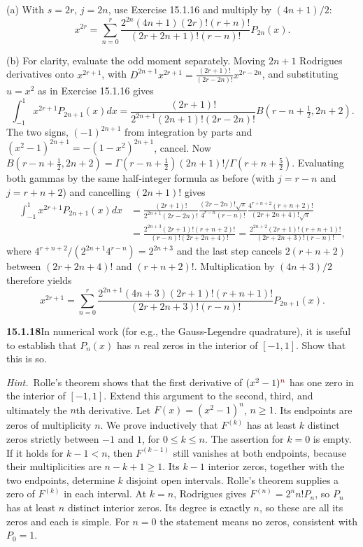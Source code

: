 (a) With $s=2r$, $j=2n$, use Exercise 15.1.16 and multiply by
$(4n+1)/2$:
\[
\boxed{x^{2r}=\sum_{n=0}^r
\frac{2^{2n}(4n+1)(2r)!(r+n)!}
{(2r+2n+1)!(r-n)!}P_{2n}(x)}.
\]

(b) For clarity, evaluate the odd moment separately. Moving $2n+1$
Rodrigues derivatives onto $x^{2r+1}$, with
$D^{2n+1}x^{2r+1}=\frac{(2r+1)!}{(2r-2n)!}x^{2r-2n}$, and substituting
$u=x^2$ as in Exercise 15.1.16 gives
\[
\int_{-1}^1x^{2r+1}P_{2n+1}(x)dx
=\frac{(2r+1)!}{2^{2n+1}(2n+1)!(2r-2n)!}
 B(r-n+\tfrac12,2n+2).
\]
The two signs, $(-1)^{2n+1}$ from integration by parts and
$(x^2-1)^{2n+1}=-(1-x^2)^{2n+1}$, cancel. Now
$B(r-n+\frac12,2n+2)=\Gamma(r-n+\frac12)(2n+1)!/\Gamma(r+n+\frac52)$.
Evaluating both gammas by the same half-integer formula as before
(with $j=r-n$ and $j=r+n+2$) and cancelling $(2n+1)!$ gives
\begin{align*}
\int_{-1}^1x^{2r+1}P_{2n+1}(x)dx
&=\frac{(2r+1)!}{2^{2n+1}(2r-2n)!}
\frac{(2r-2n)!\sqrt\pi}{4^{r-n}(r-n)!}
\frac{4^{r+n+2}(r+n+2)!}{(2r+2n+4)!\sqrt\pi}\\
&=\frac{2^{2n+3}(2r+1)!(r+n+2)!}{(r-n)!(2r+2n+4)!}
=\frac{2^{2n+2}(2r+1)!(r+n+1)!}
{(2r+2n+3)!(r-n)!},
\end{align*}
where $4^{r+n+2}/(2^{2n+1}4^{r-n})=2^{2n+3}$ and the last step cancels
$2(r+n+2)$ between $(2r+2n+4)!$ and $(r+n+2)!$.
Multiplication by $(4n+3)/2$ therefore yields
\[
\boxed{x^{2r+1}=\sum_{n=0}^r
\frac{2^{2n+1}(4n+3)(2r+1)!(r+n+1)!}
{(2r+2n+3)!(r-n)!}P_{2n+1}(x)}.
\]

\par\bigskip
\noindent\textbf{15.1.18}\quad In numerical work (for e.g., the
Gauss-Legendre quadrature), it is useful to establish that $P_{n}(x)$
has $n$ real zeros in the interior of $[-1,1]$. Show that this is so.
\par\emph{Hint.}~Rolle's theorem shows that the first derivative of
$(x^{2}-1)^{\erratum{n}}$ has one zero in the interior of $[-1,1]$. Extend this
argument to the second, third, and ultimately the $n$th derivative.
\solution
{}
Let $F(x)=(x^2-1)^n$, $n\ge1$. Its endpoints are zeros of
multiplicity $n$. We prove inductively that $F^{(k)}$ has at least
$k$ distinct zeros strictly between $-1$ and $1$, for $0\le k\le n$.
The assertion for $k=0$ is empty. If it holds for $k-1<n$, then
$F^{(k-1)}$ still vanishes at both endpoints, because their
multiplicities are $n-k+1\ge1$. Its $k-1$ interior zeros, together
with the two endpoints, determine $k$ disjoint open intervals.
Rolle's theorem supplies a zero of $F^{(k)}$ in each interval.
At $k=n$, Rodrigues gives $F^{(n)}=2^nn!P_n$, so $P_n$ has at least
$n$ distinct interior zeros. Its degree is exactly $n$, so these are
all its zeros and each is simple. For $n=0$ the statement means no zeros,
consistent with $P_0=1$.

